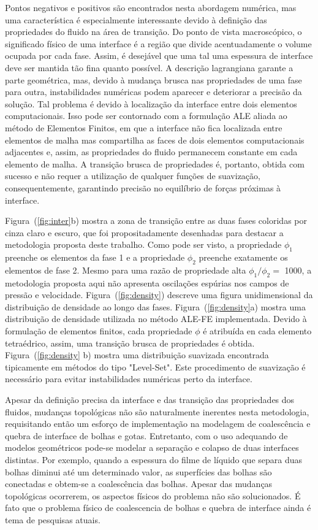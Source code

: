 \documentclass[a4paper,portuges]{article}
\begin{document}
Pontos negativos e positivos são encontrados nesta abordagem numérica,
mas uma característica é especialmente interessante devido à definição
das propriedades do fluido na área de transição. Do ponto de vista
macroscópico, o significado físico de uma interface é a região que
divide acentuadamente o volume ocupada por cada fase. Assim, é desejável
que uma tal uma espessura de interface deve ser mantida tão fina quanto
possível. A descrição lagrangiana garante a parte geométrica, mas,
devido à mudança brusca nas propriedades de uma fase para outra,
instabilidades numéricas podem aparecer e deteriorar a precisão da
solução. Tal problema é devido à localização da interface entre dois
elementos computacionais. Isso pode ser contornado com a formulação ALE
aliada ao método de Elementos Finitos, em que a interface não fica
localizada entre elementos de malha mas compartilha as faces de dois
elementos computacionais adjacentes e, assim, as propriedades do fluido
permanecem constante em cada elemento de malha. A transição brusca de
propriedades é, portanto, obtida com sucesso e não requer a utilização
de qualquer funções de suavização, consequentemente, garantindo precisão
no equilíbrio de forças próximas à interface.

Figura~(\ref{fig:inter}b) mostra a zona de transição entre as duas fases
coloridas por cinza claro e escuro, que foi propositadamente desenhadas
para destacar a metodologia proposta deste trabalho. Como pode ser
visto, a propriedade $\phi_1$ preenche os elementos da fase 1 e a
propriedade $\phi_2$ preenche exatamente os elementos de fase 2. Mesmo
para uma razão de propriedade alta $\phi_1 / \phi_2 =$ 1000, a
metodologia proposta aqui não apresenta oscilações espúrias nos campos
de pressão e velocidade. Figura~(\ref{fig:density}) descreve uma figura
unidimensional da distribuição de densidade ao longo das fases.
Figura~(\ref{fig:density}a) mostra uma distribuição de densidade
utilizada no método ALE-FE implementada. Devido à formulação de
elementos finitos, cada propriedade $\phi$ é atribuída en cada elemento
tetraédrico, assim, uma transição brusca de propriedades é obtida.
Figura~(\ref{fig:density} b) mostra uma distribuição suavizada
encontrada tipicamente em métodos do tipo "Level-Set". Este procedimento
de suavização é necessário para evitar instabilidades numéricas perto da
interface.

Apesar da definição precisa da interface e das transição das
propriedades dos fluidos, mudanças topológicas não são naturalmente
inerentes nesta metodologia, requisitando então um esforço de
implementação na modelagem de coalescência e quebra de interface de
bolhas e gotas. Entretanto, com o uso adequando de modelos geométricos
pode-se modelar a separação e colapso de duas interfaces distintas. Por
exemplo, quando a espessura do filme de líquido que separa duas bolhas
diminui até um determinado valor, as superfícies das bolhas são
conectadas e obtem-se a coalescência das bolhas. Apesar das mudanças
topológicas ocorrerem, os aspectos físicos do problema não são
solucionados. É fato que o problema físico de coalescencia de bolhas e
quebra de interface ainda é tema de pesquisas atuais.
\end{document}
